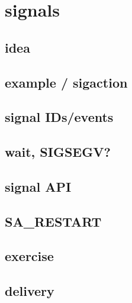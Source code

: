 
\section{signals}

\subsection{idea}



\subsection{example / sigaction}



\subsection{signal IDs/events}




\subsection{wait, SIGSEGV?}



\subsection{signal API}



\subsection{SA\_RESTART}



\subsection{exercise}


\subsection{delivery}



